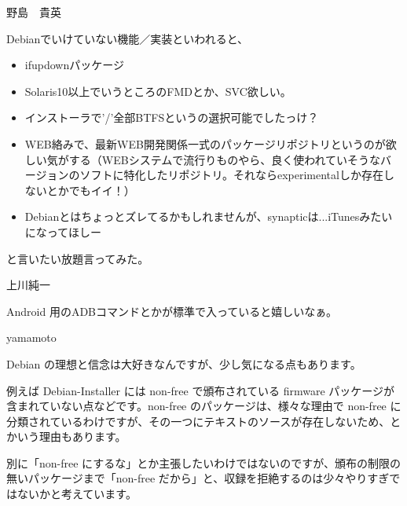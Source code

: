 \begin{prework}{ 野島　貴英 }

Debianでいけていない機能／実装といわれると、

\begin{itemize}
 \item  ifupdownパッケージ
 \item  Solaris10以上でいうところのFMDとか、SVC欲しい。
 \item  インストーラで'/'全部BTFSというの選択可能でしたっけ？
 \item  WEB絡みで、最新WEB開発関係一式のパッケージリポジトリというのが欲しい気がする（WEBシステムで流行りものやら、良く使われていそうなバージョンのソフトに特化したリポジトリ。それならexperimentalしか存在しないとかでもイイ！）
 \item  Debianとはちょっとズレてるかもしれませんが、synapticは...iTunesみたいになってほしー
\end{itemize}

と言いたい放題言ってみた。
\end{prework}

\begin{prework}{ 上川純一 }

Android 用のADBコマンドとかが標準で入っていると嬉しいなぁ。
\end{prework}

\begin{prework}{ yamamoto }

Debian の理想と信念は大好きなんですが、少し気になる点もあります。

例えば Debian-Installer には non-free で頒布されている firmware パッケージが含まれていない点などです。non-free のパッケージは、様々な理由で non-free に分類されているわけですが、その一つにテキストのソースが存在しないため、とかいう理由もあります。

別に「non-free にするな」とか主張したいわけではないのですが、頒布の制限の無いパッケージまで「non-free だから」と、収録を拒絶するのは少々やりすぎではないかと考えています。
\end{prework}

